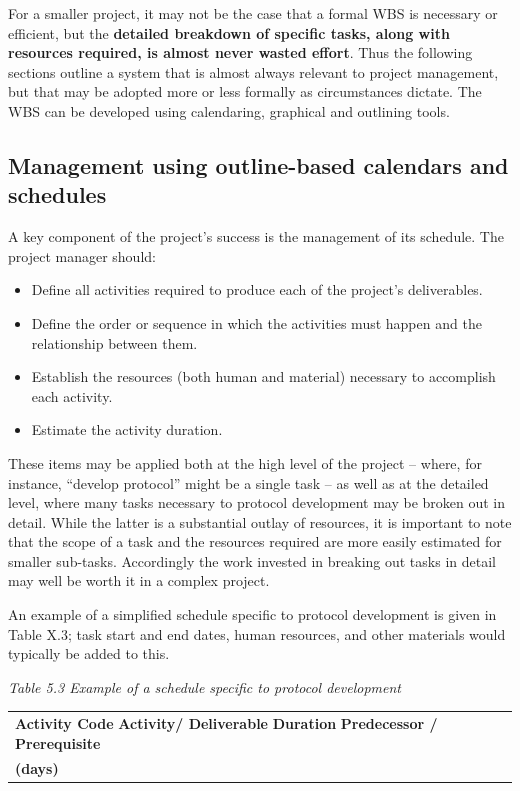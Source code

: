 \documentclass[]{book}
\begin{document}
For a smaller project, it may not be the case that a formal WBS is
necessary or efficient, but the \textbf{detailed breakdown of specific
tasks, along with resources required, is almost never wasted effort}.
Thus the following sections outline a system that is almost always
relevant to project management, but that may be adopted more or less
formally as circumstances dictate. The WBS can be developed using
calendaring, graphical and outlining tools.

\subsection{Management using outline-based calendars and
schedules}\label{management-using-outline-based-calendars-and-schedules}

A key component of the project's success is the management of its
schedule. The project manager should:

\begin{itemize}
\item
  Define all activities required to produce each of the project's
  deliverables.
\item
  Define the order or sequence in which the activities must happen and
  the relationship between them.
\item
  Establish the resources (both human and material) necessary to
  accomplish each activity.
\item
  Estimate the activity duration.
\end{itemize}

These items may be applied both at the high level of the project --
where, for instance, ``develop protocol'' might be a single task -- as
well as at the detailed level, where many tasks necessary to protocol
development may be broken out in detail. While the latter is a
substantial outlay of resources, it is important to note that the scope
of a task and the resources required are more easily estimated for
smaller sub-tasks. Accordingly the work invested in breaking out tasks
in detail may well be worth it in a complex project.

An example of a simplified schedule specific to protocol development is
given in Table X.3; task start and end dates, human resources, and other
materials would typically be added to this.

\emph{Table 5.3 Example of a schedule specific to protocol development}

\begin{longtable}[]{@{}l@{}}
\toprule
\begin{minipage}[t]{0.95\columnwidth}\raggedright\strut
\textbf{Activity Code} \textbf{Activity/ Deliverable} \textbf{Duration}
\textbf{Predecessor / Prerequisite}\strut
\end{minipage}\tabularnewline
\begin{minipage}[t]{0.95\columnwidth}\raggedright\strut
\textbf{(days)}\strut
\end{minipage}\tabularnewline
\bottomrule
\end{longtable}
\end{document}

